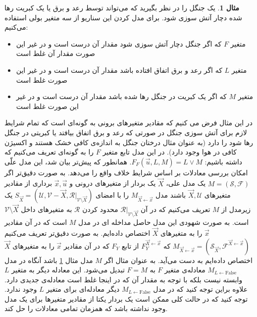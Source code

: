 \documentclass[
msc,
irfonts
]{./tex/tehran-thesis}
\newcommand{\پ}{پروژه/پایان‌نامه/رساله }
\theoremstyle{definition}
\theoremstyle{theorem}
\theoremstyle{definition}
\newtheorem{example}[definition]{مثال}
\numberwithin{algorithm}{chapter}
\newcommand{\F}{\mathrm{False}}
\newcommand{\la}{\leftarrow}
\newcommand{\mc}[1]{\mathcal{#1}}
\newcommand{\lf}[1]{\LTRfootnote{#1}}
\begin{document}
\begin{example}
      \label{ex:hp:fire}
      یک جنگل را در نظر بگیرید که می‌تواند توسط رعد و برق یا یک کبریت رها شده دچار آتش سوزی شود.
      برای مدل کردن این سناریو از سه متغیر بولی\lf{Boolean}
      استفاده می‌کنیم:
      \begin{itemize}
            \item متغیر
                  $F$
                  که اگر جنگل دچار آتش سوزی شود مقدار آن درست است و در غیر این صورت مقدار آن غلط است
            \item متغیر
                  $L$
                  که اگر رعد و برق اتفاق افتاده باشد مقدار آن درست است و در غیر این صورت غلط است
            \item متغیر
                  $M$
                  که اگر یک کبریت در جنگل رها شده باشد مقدار آن درست است و در غیر این صورت غلط است
      \end{itemize}
\end{example}
در این مثال فرض می کنیم که مقادیر متغیر‌های برونی به گونه‌ای است که تمام شرایط لازم برای آتش سوزی جنگل در صورتی که رعد و برق اتفاق بیافتد یا کبریتی در جنگل رها شود را دارد
(به عنوان مثال درختان جنگل به اندازه‌ی کافی خشک هستند و اکسیژن کافی در هوا وجود دارد).
در این مدل تابع متغیر
$F$
را به گونه‌ای تعریف می‌کنیم که داشته باشیم:
$F_F(\vec u, L , M) = L \vee M$.
همانطور که پیش‌تر بیان شد، این مدل علّی امکان بررسی معادلات بر اساس شرایط خلاف واقع را می‌دهد.
به صورت دقیق‌تر اگر
$M = (\mc{S},\mc{F})$
یک مدل علی،
$\vec X$
یک بردار از متغیرهای درونی و
$\vec{x}, \vec{u}$
برداری از مقادیر متغیر‌های
$\vec{X},\mc{U}$
باشند
مدل
$M_{\vec{X}\la \vec{x}}$
را با امضای
$S_{\vec X}=(\mc{U},\mc{V}-\vec X,\mc{R}|_{\mc{V} \setminus \vec{X}})$
یک زیرمدل\lf{Sub-Model}
از
$M$
تعریف می‌کنیم که در آن
$\mc{R}|_{\mc{V}\setminus \vec X}$
محدود کردن 
$\mc{R}$
به متغیر‌های داخل 
$\mc{V} \setminus \vec X$
است.
به صورت شهودی این مدل حاصل مداخله‌\lf{Intervention}
ای در مدل
$M$
است که در آن مقادیر
$\vec{x}$
را به متغیر‌های
$\vec{X}$
اختصاص داده‌ایم.
به صورت دقیق‌تر تعریف می‌کنیم
$M_{\vec{X}\la\vec{x}} = (\mc{S}_{\vec{X}},\mc{F}^{\vec{X}\la\vec{x}})$
که
$F_Y^{\vec{X}\la\vec{x}}$
از تابع
$F_Y$
که در آن مقادیر
$\vec{x}$
را به متغیرهای
$\vec{X}$
اختصاص داده‌ایم به دست می‌آید.
به عنوان مثال اگر
$M$
مدل مثال
\ref{ex:hp:fire}
باشد آنگاه در مدل
$M_{L\la \F}$
معادله‌ی متغیر
$F$
به
$F = M$
تبدیل می‌شود.
این معادله دیگر به متغیر
$L$
وابسته نیست بلکه با توجه به مقدار آن که در اینجا غلط است معادله‌ی جدیدی دارد.
علاوه براین توجه کنید که در مدل
$M_{L\la \F}$
دیگر معادله‌ای برای متغیر
$L$
وجود ندارد.
توجه کنید که در حالت کلی ممکن است یک بردار یکتا از مقادیر متغیر‌ها برای یک مدل وجود نداشته باشد که همزمان تمامی معادلات را حل کند.
\end{document}
